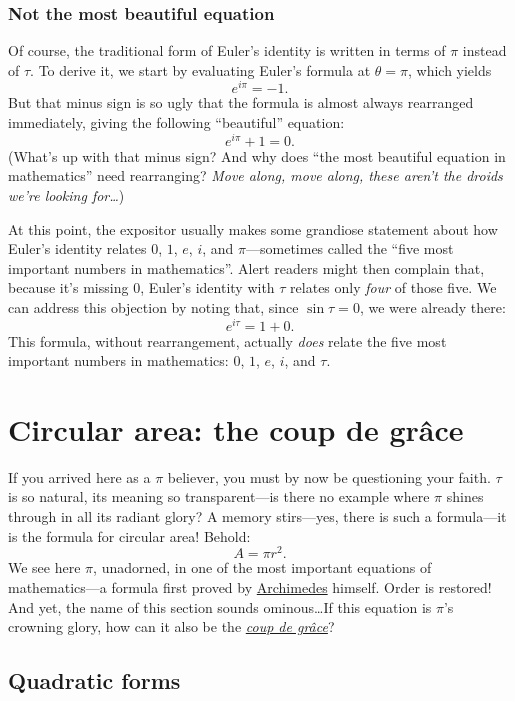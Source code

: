 \documentclass{article}
\begin{document}
    \subsubsection{Not the most beautiful equation} %
    \label{sec:not_the_most_beautiful_equation}

Of course, the traditional form of Euler's identity is written in terms of $\pi$ instead of $\tau$. To derive it, we start by evaluating Euler's formula at $\theta = \pi$, which yields
\[ e^{i\pi} = -1. \]
But that minus sign is so ugly that the formula is almost always rearranged immediately, giving the following ``beautiful'' equation:
\[ e^{i\pi} + 1 = 0. \]
(What's up with that minus sign? And why does ``the most beautiful equation in mathematics'' need rearranging? \emph{Move along, move along, these aren't the droids we're looking for\ldots})

At this point, the expositor usually makes some grandiose statement about how Euler's identity relates $0$, $1$, $e$, $i$, and $\pi$---sometimes called the ``five most important numbers in mathematics''. Alert readers might then complain that, because it's missing $0$, Euler's identity with $\tau$ relates only \emph{four} of those five. We can address this objection by noting that, since $\sin\tau = 0$, we were already there:
\[ e^{i\tau} = 1 + 0. \]
This formula, without rearrangement, actually \emph{does} relate the five most important numbers in mathematics: $0$, $1$, $e$, $i$, and $\tau$.

\section{Circular area: the coup de gr\^{a}ce} %
\label{sec:circular_area}

If you arrived here as a $\pi$ believer, you must by now be questioning your faith. $\tau$ is so natural, its meaning so transparent---is there no example where $\pi$ shines through in all its radiant glory? A memory stirs---yes, there is such a formula---it is the formula for circular area! Behold:
\[ A = \pi r^2. \]
We see here $\pi$, unadorned, in one of the most important equations of mathematics---a formula first proved by \href{Archimedes}{Archimedes} himself. Order is restored! And yet, the name of this section sounds ominous\ldots If this equation is $\pi$'s crowning glory, how can it also be the \href{http://en.wikipedia.org/wiki/Coup_de_grace}{\emph{coup de gr\^{a}ce}}?


  \subsection{Quadratic forms} %
  \label{sec:quadratic_forms}
\end{document}
